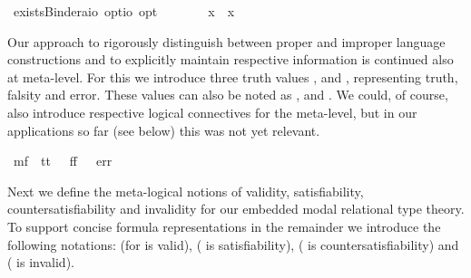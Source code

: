 \begin{isabellebody}
\isamarkupfalse%
\ existsBinder{\isacharcolon}{\isacharcolon}{\isachardoublequoteopen}{\isacharparenleft}{\isacharprime}a{\isasymRightarrow}io\ opt{\isacharparenright}{\isasymRightarrow}io\ opt{\isachardoublequoteclose}\ {\isacharparenleft}\ {\isachardoublequoteopen}\isactrlbold {\isasymexists}{\isachardoublequoteclose}\ {\isacharbrackleft}{}{\isacharbrackright}\ {}{\isacharparenright}\ \ \ {\isachardoublequoteopen}\isactrlbold {\isasymexists}\ x{\isachardot}\ {\isasymphi}\ x\ {\isasymequiv}\ \isactrlbold {\isasymexists}\ {\isasymphi}{\isachardoublequoteclose}%
\isamarkuptrue%
%
\begin{isamarkuptext}%
Our approach to rigorously distinguish between proper and improper language constructions 
 and to explicitly maintain respective information is continued also at meta-level. For this 
 we introduce three truth values ,
  and , representing truth, falsity and error. These values can also 
 be noted as \isa{{\isasymtop}}, \isa{{\isasymbottom}} and \isa{{\isacharasterisk}}. We could, of course, also introduce  
 respective logical connectives for the meta-level, but in our applications so far (see below)
 this was not yet relevant.%
\end{isamarkuptext}%
\isamarkuptrue%
\isamarkupfalse%
\ mf\ {\isacharequal}\ tt\ {\isacharparenleft}{\isachardoublequoteopen}{\isasymtop}{\isachardoublequoteclose}{\isacharparenright}\ {\isacharbar}\ ff\ {\isacharparenleft}{\isachardoublequoteopen}{\isasymbottom}{\isachardoublequoteclose}{\isacharparenright}\ {\isacharbar}\ err\ {\isacharparenleft}{\isachardoublequoteopen}{\isacharasterisk}{\isachardoublequoteclose}{\isacharparenright}%
\begin{isamarkuptext}%
Next we define the meta-logical notions of validity, satisfiability, 
 countersatisfiability and invalidity for our embedded modal relational type theory. To support
 concise formula representations in the remainder we introduce the following notations: \isa{{\isacharbrackleft}{\isasymphi}{\isacharbrackright}} 
 (for \isa{{\isasymphi}} is valid),  (\isa{{\isasymphi}} is satisfiability),  
 (\isa{{\isasymphi}} is countersatisfiability) and  (\isa{{\isasymphi}} is invalid).%

\end{isamarkuptext}
\end{isabellebody}
